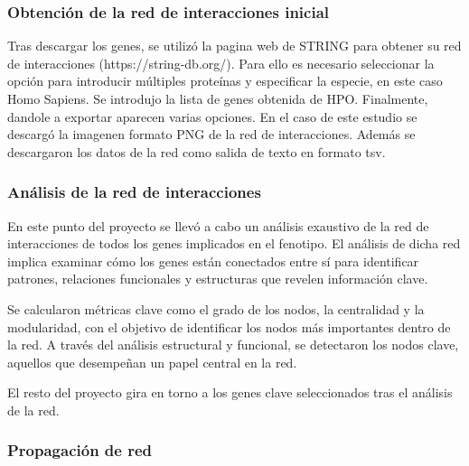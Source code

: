 \subsubsection{Obtención de la red de interacciones inicial}

Tras descargar los genes, se utilizó la pagina web de STRING para obtener su red de interacciones (https://string-db.org/). Para ello es necesario seleccionar la opción para introducir múltiples proteínas y especificar la especie, en este caso Homo Sapiens. Se introdujo la lista de genes obtenida de HPO. Finalmente, dandole a exportar aparecen varias opciones. En el caso de este estudio se descargó la imagenen formato PNG de la red de interacciones. Además se descargaron los datos de la red como salida de texto en formato tsv.


\subsubsection{Análisis de la red de interacciones}

En este punto del proyecto se llevó a cabo un análisis exaustivo de la red de interacciones de todos los genes implicados en el fenotipo. El análisis de dicha red  implica examinar cómo los genes están conectados entre sí para identificar patrones, relaciones funcionales y estructuras que revelen información clave. 

Se calcularon métricas clave como el grado de los nodos, la centralidad y la modularidad, con el objetivo de identificar los nodos más importantes dentro de la red. A través del análisis estructural y funcional, se detectaron los nodos clave, aquellos que desempeñan un papel central en la red.

El resto del proyecto gira en torno a los genes clave seleccionados tras el análisis de la red.

\subsubsection{Propagación de red}

